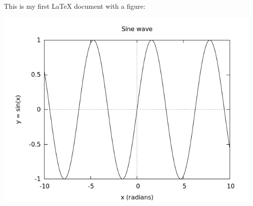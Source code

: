 \documentclass[11]{article}
\begin{document}
This is my first LaTeX document with a figure:

\includegraphics[scale=0.5]{show_image.png}
\end{document}
